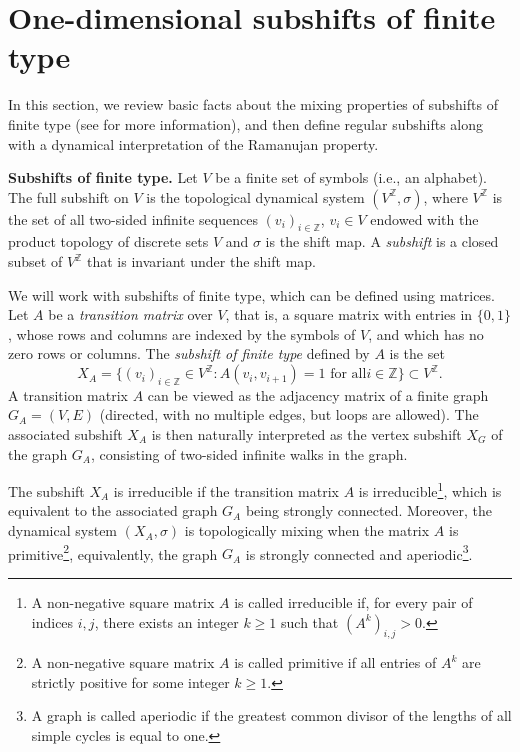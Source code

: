 \documentclass[12pt]{article}
\theoremstyle{definition}
\begin{document}
\setcounter{section}{1}
\section{One-dimensional subshifts of finite type}

In this section, we review basic facts about the mixing properties of subshifts of finite type (see \cite{Baladi,Walters1982} for more information), and then define regular subshifts along with a dynamical interpretation of the Ramanujan property.

\vspace{0.2cm}
\textbf{Subshifts of finite type.}
Let $V$ be a finite set of symbols (i.e., an alphabet). The full subshift on $V$ is the topological dynamical system $(V^{\mathbb{Z}},\sigma)$, where $V^{\mathbb{Z}}$ is the set of all two-sided infinite sequences $(v_i)_{i\in\mathbb{Z}}$, $v_i\in V$ endowed with the product topology of discrete sets $V$ and $\sigma$ is the shift map. A \textit{subshift} is a closed subset of $V^{\mathbb{Z}}$ that is invariant under the shift map.

We will work with subshifts of finite type, which can be defined using matrices.
Let $A$ be a \textit{transition matrix} over $V$, that is, a square matrix with entries in $\{0,1\}$, whose rows and columns are indexed by the symbols of $V$, and which has no zero rows or columns.
The \textit{subshift of finite type} defined by $A$ is the set
\[
X_A=\{ (v_i)_{i\in\mathbb{Z}}\in V^{\mathbb{Z}} : A(v_i,v_{i+1})=1 \mbox{ for all
$i\in\mathbb{Z}$} \}\subset V^{\mathbb{Z}}.
\]
A transition matrix $A$ can be viewed as the adjacency matrix of a finite graph $G_A=(V,E)$ (directed, with no multiple edges, but loops are allowed). The associated subshift $X_A$ is then naturally interpreted as the vertex subshift $X_G$ of the graph $G_A$, consisting of two-sided infinite walks in the graph.

The subshift $X_A$ is irreducible if the transition matrix $A$ is irreducible\footnote{A non-negative square matrix $A$ is called irreducible if, for every pair of indices $i,j$, there exists an integer $k \geq 1 $ such that \( (A^k)_{i,j} > 0 \).}, which is equivalent to the associated graph $G_A$ being strongly connected. Moreover, the dynamical system $(X_A,\sigma)$ is topologically mixing when the matrix $A$ is primitive\footnote{A non-negative square matrix $A$ is called primitive if all entries of $A^k$ are strictly positive for some integer $k\geq 1$.}, equivalently, the graph $G_A$ is strongly connected and aperiodic\footnote{A graph is called aperiodic if the greatest common divisor of the lengths of all simple cycles is equal to one.}.
\end{document}
